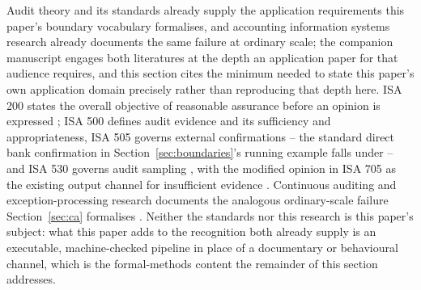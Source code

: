 \documentclass[smallcondensed,envcountsect,natbib]{svjour3}
\begin{document}
Audit theory and its standards already supply the application requirements this paper's boundary vocabulary formalises, and accounting information systems research already documents the same failure at ordinary scale; the companion manuscript engages both literatures at the depth an application paper for that audience requires, and this section cites the minimum needed to state this paper's own application domain precisely rather than reproducing that depth here. ISA 200 states the overall objective of reasonable assurance before an opinion is expressed \citep{isa200}; ISA 500 defines audit evidence and its sufficiency and appropriateness, ISA 505 governs external confirmations -- the standard direct bank confirmation in Section~\ref{sec:boundaries}'s running example falls under -- and ISA 530 governs audit sampling \citep{isa500, isa505, isa530}, with the modified opinion in ISA 705 as the existing output channel for insufficient evidence \citep{isa705}. Continuous auditing and exception-processing research documents the analogous ordinary-scale failure Section~\ref{sec:ca} formalises \citep{alles2006, issa2016, austin2021}. Neither the standards nor this research is this paper's subject: what this paper adds to the recognition both already supply is an executable, machine-checked pipeline in place of a documentary or behavioural channel, which is the formal-methods content the remainder of this section addresses.
\end{document}
